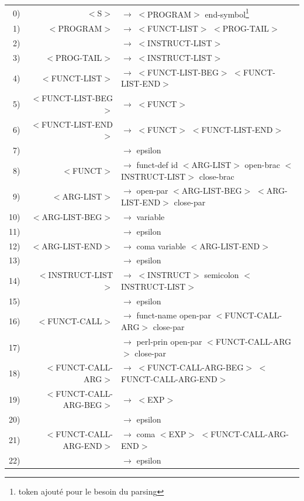 \documentclass[a4paper,10pt]{article}
\begin{document}
\hspace{-3.0cm}\begin{tabular}{rrl}
0)&	$<$S$>$						& $\rightarrow$ $<$PROGRAM$>$ end-symbol\footnote{token ajouté pour le besoin du parsing} \\
1)&	$<$PROGRAM$>$				& $\rightarrow$ $<$FUNCT-LIST$>$ $<$PROG-TAIL$>$ \\
2)&								& $\rightarrow$ $<$INSTRUCT-LIST$>$ \\
3)&	$<$PROG-TAIL$>$				& $\rightarrow$ $<$INSTRUCT-LIST$>$ \\
						
4)&	$<$FUNCT-LIST$>$			& $\rightarrow$ $<$FUNCT-LIST-BEG$>$ $<$FUNCT-LIST-END$>$ \\
5)&	$<$FUNCT-LIST-BEG$>$		& $\rightarrow$ $<$FUNCT$>$ \\
6)&	$<$FUNCT-LIST-END$>$		& $\rightarrow$ $<$FUNCT$>$ $<$FUNCT-LIST-END$>$ \\
7)&								& $\rightarrow$ epsilon \\
8)&	$<$FUNCT$>$					& $\rightarrow$ funct-def id $<$ARG-LIST$>$ open-brac $<$INSTRUCT-LIST$>$ close-brac \\
9)&	$<$ARG-LIST$>$				& $\rightarrow$ open-par $<$ARG-LIST-BEG$>$ $<$ARG-LIST-END$>$ close-par\\
10)&	$<$ARG-LIST-BEG$>$			& $\rightarrow$ variable \\
11)&								& $\rightarrow$ epsilon \\
12)&	$<$ARG-LIST-END$>$			& $\rightarrow$ coma variable $<$ARG-LIST-END$>$ \\
13)&								& $\rightarrow$ epsilon \\
14)&	$<$INSTRUCT-LIST$>$			& $\rightarrow$ $<$INSTRUCT$>$ semicolon $<$INSTRUCT-LIST$>$ \\
15)&								& $\rightarrow$ epsilon \\
16)&	$<$FUNCT-CALL$>$			& $\rightarrow$ funct-name open-par $<$FUNCT-CALL-ARG$>$ close-par \\
17)&								& $\rightarrow$ perl-prin open-par $<$FUNCT-CALL-ARG$>$ close-par\\
18)&	$<$FUNCT-CALL-ARG$>$		& $\rightarrow$ $<$FUNCT-CALL-ARG-BEG$>$ $<$FUNCT-CALL-ARG-END$>$ \\
19)&	$<$FUNCT-CALL-ARG-BEG$>$	& $\rightarrow$ $<$EXP$>$ \\
20)&								& $\rightarrow$ epsilon \\
21)&	$<$FUNCT-CALL-ARG-END$>$	& $\rightarrow$ coma $<$EXP$>$ $<$FUNCT-CALL-ARG-END$>$ \\
22)&								& $\rightarrow$ epsilon \\

\end{tabular}
\end{document}

